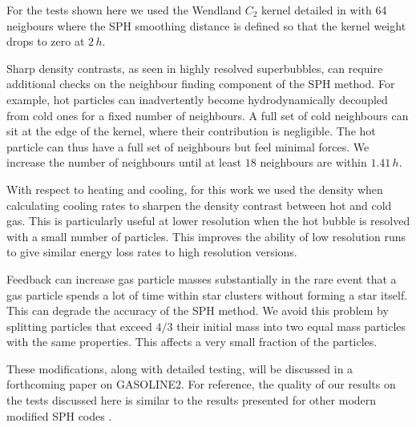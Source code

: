 For the tests shown here we used the Wendland $C_2$ kernel detailed in
\citet{Dehnen2012} with 64 neigbours where the SPH smoothing distance is defined
so that the kernel weight drops to zero at $2\,h$.  

Sharp density contrasts, as seen in highly resolved superbubbles, can require
additional checks on the neighbour finding component of the SPH method.  For
example, hot particles can inadvertently become hydrodynamically decoupled from
cold ones for a fixed number of neighbours.  A full set of cold neighbours can
sit at the edge of the kernel, where their contribution is negligible.  The hot
particle can thus have a full set of neighbours but feel minimal forces.  We
increase the number of neighbours until at least $18$ neighbours are within
$1.41\,h$.  

With respect to heating and cooling, for this work we used the
\citet{Ritchie2001} density when calculating cooling rates to sharpen the
density contrast between hot and cold gas.  This is particularly useful at lower
resolution when the hot bubble is resolved with a small number of particles.
This improves the ability of low resolution runs to give similar energy loss
rates to high resolution versions.
 
Feedback can increase gas particle masses substantially in the rare event that a
gas particle spends a lot of time within star clusters without forming a star
itself.  This can degrade the accuracy of the SPH method.  We avoid this problem
by splitting particles that exceed $4/3$ their initial mass into two equal mass
particles with the same properties.  This affects a very small fraction of the
particles.

These modifications, along with detailed testing, will be discussed in a
forthcoming paper on {\sc GASOLINE2}.  For reference, the quality of our results
on the tests discussed here is similar to the results presented for other modern
modified SPH codes \citep[e.g.][]{Hopkins2013}. 

